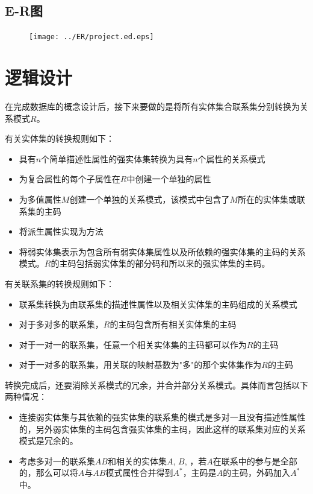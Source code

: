 \documentclass{myreport}
\begin{document}
\subsection{E-R图}

\begin{figure}[H]
	\centering
	\texttt{[image: ../ER/project.ed.eps]}
	\caption{}
	\label{fig:ER Graph}
\end{figure}

\section{逻辑设计}

在完成数据库的概念设计后，接下来要做的是将所有实体集合联系集分别转换为关系模式$R$。

有关实体集的转换规则如下：

\begin{itemize}
	\item 具有$n$个简单描述性属性的强实体集转换为具有$n$个属性的关系模式
	\item 为复合属性的每个子属性在$R$中创建一个单独的属性
	\item 为多值属性$M$创建一个单独的关系模式，该模式中包含了$M$所在的实体集或联系集的主码
	\item 将派生属性实现为方法
	\item 将弱实体集表示为包含所有弱实体集属性以及所依赖的强实体集的主码的关系模式。$R$的主码包括弱实体集的部分码和所以来的强实体集的主码。
\end{itemize}

有关联系集的转换规则如下：

\begin{itemize}
	\item 联系集转换为由联系集的描述性属性以及相关实体集的主码组成的关系模式
	\item 对于多对多的联系集，$R$的主码包含所有相关实体集的主码
	\item 对于一对一的联系集，任意一个相关实体集的主码都可以作为$R$的主码
	\item 对于一对多的联系集，用关联的映射基数为"多"的那个实体集作为$R$的主码
\end{itemize}

转换完成后，还要消除关系模式的冗余，并合并部分关系模式。具体而言包括以下两种情况：

\begin{itemize}
	\item 连接弱实体集与其依赖的强实体集的联系集的模式是多对一且没有描述性属性的，另外弱实体集的主码包含强实体集的主码，因此这样的联系集对应的关系模式是冗余的。
	\item 考虑多对一的联系集$AB$和相关的实体集$A$, $B$, ，若$A$在联系中的参与是全部的，那么可以将$A$与$AB$模式属性合并得到$A^*$，主码是$A$的主码，外码加入$A^*$中。
\end{itemize}
\end{document}
